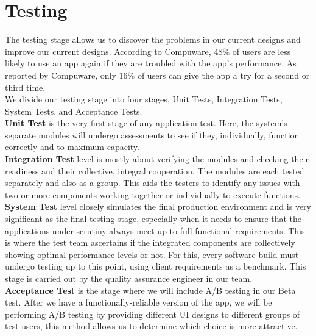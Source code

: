 \section{Testing}
The testing stage allows us to discover the problems in our current designs and improve our current designs. 
According to Compuware, 48\% of users are less likely to use an app again if they are troubled with the app’s performance.
As reported by Compuware, only 16\% of users can give the app a try for a second or third time. 
\\
We divide our testing stage into four stages, Unit Tests, Integration Tests, System Tests, and Acceptance Tests.
\\\textbf{Unit Test} is the very first stage of any application test. Here, the system’s separate modules will undergo assessments to see if they, individually, function correctly and to maximum capacity. 
\\\textbf{Integration Test} level is mostly about verifying the modules and checking their readiness and their collective, integral cooperation. The modules are each tested separately and also as a group. This aids the testers to identify any issues with two or more components working together or individually to execute functions.
\\\textbf{System Test} level closely simulates the final production environment and is very significant as the final testing stage, especially when it needs to ensure that the applications under scrutiny always meet up to full functional requirements. 
This is where the test team ascertains if the integrated components are collectively showing optimal performance levels or not. For this, every software build must undergo testing up to this point, using client requirements as a benchmark. 
This stage is carried out by the quality assurance engineer in our team.
\\\textbf{Acceptance Test} is the stage where we will include A/B testing in our Beta test. After we have a functionally-reliable version of the app, 
we will be performing A/B testing by providing different UI designs to different groups of test users, this method allows us to 
determine which choice is more attractive.



